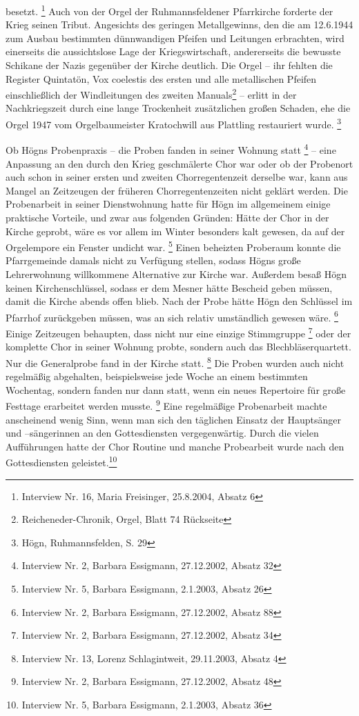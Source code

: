 \documentclass[a4paper]{article}
\begin{document}
besetzt. \footnote{Interview Nr. 16, Maria Freisinger, 25.8.2004,
Absatz 6} Auch von der Orgel der Ruhmannsfeldener Pfarrkirche forderte
der Krieg seinen Tribut. Angesichts des geringen Metallgewinns, den die
am 12.6.1944 zum Ausbau bestimmten dünnwandigen Pfeifen und Leitungen
erbrachten, wird einerseits die aussichtslose Lage der
Kriegswirtschaft, andererseits die bewusste Schikane der Nazis
gegenüber der Kirche deutlich. Die Orgel – ihr fehlten die Register
Quintatön, Vox coelestis des ersten und alle metallischen Pfeifen
einschließlich der Windleitungen des zweiten Manuals\footnote{
Reicheneder-Chronik, Orgel, Blatt 74 Rückseite} – erlitt in der
Nachkriegszeit durch eine lange Trockenheit zusätzlichen großen
Schaden, ehe die Orgel 1947 vom Orgelbaumeister Kratochwill aus
Plattling restauriert wurde. \footnote{Högn, Ruhmannsfelden, S. 29}

Ob Högns Probenpraxis – die Proben fanden in seiner Wohnung
statt \footnote{Interview Nr. 2, Barbara Essigmann, 27.12.2002, Absatz
32} – eine Anpassung an den durch den Krieg geschmälerte Chor war oder
ob der Probenort auch schon in seiner ersten und zweiten
Chorregentenzeit derselbe war, kann aus Mangel an Zeitzeugen der
früheren Chorregentenzeiten nicht geklärt werden. Die Probenarbeit in
seiner Dienstwohnung hatte für Högn im allgemeinem einige praktische
Vorteile, und zwar aus folgenden Gründen: Hätte der Chor in der Kirche
geprobt, wäre es vor allem im Winter besonders kalt gewesen, da auf der
Orgelempore ein Fenster undicht war. \footnote{Interview Nr. 5, Barbara
Essigmann, 2.1.2003, Absatz 26} Einen beheizten Proberaum konnte die
Pfarrgemeinde damals nicht zu Verfügung stellen, sodass Högns große
Lehrerwohnung willkommene Alternative zur Kirche war. Außerdem besaß
Högn keinen Kirchenschlüssel, sodass er dem Mesner hätte Bescheid geben
müssen, damit die Kirche abends offen blieb. Nach der Probe hätte Högn
den Schlüssel im Pfarrhof zurückgeben müssen, was an sich relativ
umständlich gewesen wäre. \footnote{Interview Nr. 2, Barbara Essigmann,
27.12.2002, Absatz 88} Einige Zeitzeugen behaupten, dass nicht nur eine
einzige Stimmgruppe \footnote{Interview Nr. 2, Barbara Essigmann,
27.12.2002, Absatz 34} oder der komplette Chor in seiner Wohnung
probte, sondern auch das Blechbläserquartett. Nur die Generalprobe fand
in der Kirche statt. \footnote{Interview Nr. 13, Lorenz Schlagintweit,
29.11.2003, Absatz 4} Die Proben wurden auch nicht regelmäßig
abgehalten, beispielsweise jede Woche an einem bestimmten Wochentag,
sondern fanden nur dann statt, wenn ein neues Repertoire für große
Festtage erarbeitet werden musste. \footnote{Interview Nr. 2, Barbara
Essigmann, 27.12.2002, Absatz 48} Eine regelmäßige Probenarbeit machte
anscheinend wenig Sinn, wenn man sich den täglichen Einsatz der
Hauptsänger und –sängerinnen an den Gottesdiensten vergegenwärtig.
Durch die vielen Aufführungen hatte der Chor Routine und manche
Probearbeit wurde nach den Gottesdiensten geleistet.\footnote{
Interview Nr. 5, Barbara Essigmann, 2.1.2003, Absatz 36}
\end{document}
